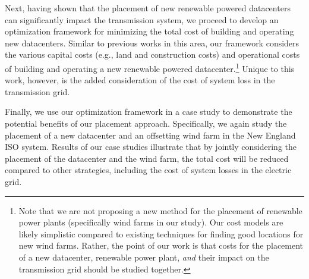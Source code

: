 Next, having shown that the placement of new renewable powered datacenters can significantly impact the transmission system, we proceed to develop an optimization framework for minimizing the total cost of building and operating new datacenters.  Similar to previous works in this area, our framework considers the various capital costs (e.g., land and construction costs) and operational costs of building and operating a new renewable powered datacenter.\footnote{Note that we are not proposing a new method for the placement of renewable power plants (specifically wind farms in our study).  Our cost models are likely simplistic compared to existing techniques for finding good locations for new wind farms.  Rather, the point of our work is that costs for the placement of a new datacenter, renewable power plant, {\em and} their impact on the transmission grid should be studied together.}
  Unique to this work, however, is the added consideration of the cost of system loss in the transmission grid.

Finally, we use our optimization framework in a case study to demonstrate the potential benefits of our placement approach.  Specifically, we again study the placement of a new datacenter and an offsetting wind farm in the New England ISO system.   Results of our case studies illustrate that by jointly considering the placement of the datacenter and the wind farm, the total cost will be reduced compared to other strategies, including the cost of system losses in the electric grid.


